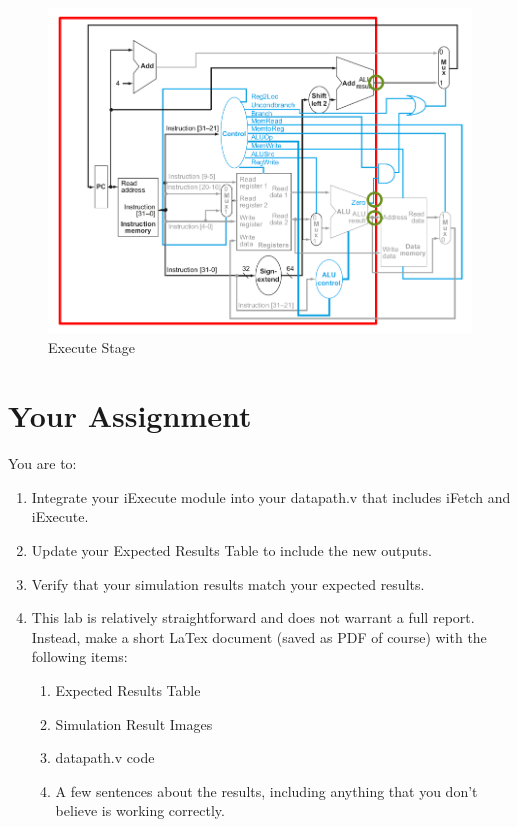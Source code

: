 \begin{figure}
	\caption{Execute Stage}\label{fig:integrated_execute}
	\begin{center}
		\includegraphics[width=4.75in]{../images/integrated_execute.png}
	\end{center}
\end{figure} 

\section{Your Assignment}

You are to:
\begin{enumerate}
\item Integrate your iExecute module into your datapath.v that includes iFetch and iExecute.
\item Update your Expected Results Table to include the new outputs.
\item Verify that your simulation results match your expected results.
\item This lab is relatively straightforward and does not warrant a full report.  Instead, make a short LaTex document (saved as PDF of course) with the following items:
\begin{enumerate}
	\item Expected Results Table
	\item Simulation Result Images
	\item datapath.v code
	\item A few sentences about the results, including anything that you don't believe is working correctly.
\end{enumerate}
\end{enumerate} 